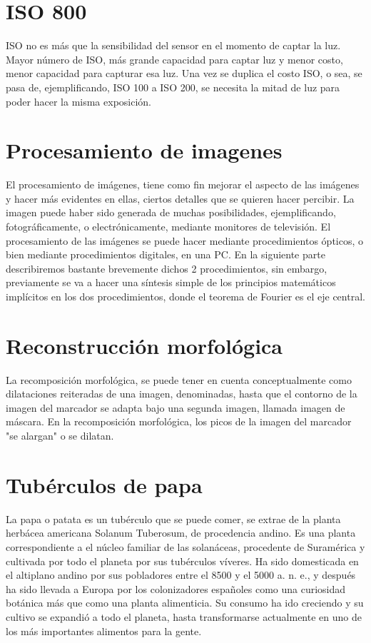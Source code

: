 \section{ISO 800} ISO no es más que la sensibilidad del sensor en el momento de captar la luz. Mayor número de ISO, más grande capacidad para captar luz y menor costo, menor capacidad para capturar esa luz. Una vez se duplica el costo ISO, o sea, se pasa de, ejemplificando, ISO 100 a ISO 200, se necesita la mitad de luz para poder hacer la misma exposición.
\\ 

\section{Procesamiento de imagenes} El procesamiento de imágenes, tiene como fin mejorar el aspecto de las imágenes y hacer más evidentes en ellas, ciertos detalles que se quieren hacer percibir. La imagen puede haber sido generada de muchas posibilidades, ejemplificando, fotográficamente, o electrónicamente, mediante monitores de televisión. El procesamiento de las imágenes se puede hacer mediante procedimientos ópticos, o bien mediante procedimientos digitales, en una PC. En la siguiente parte describiremos bastante brevemente dichos 2 procedimientos, sin embargo, previamente se va a hacer una síntesis simple de los principios matemáticos implícitos en los dos procedimientos, donde el teorema de Fourier es el eje central.
\\ 

\section{Reconstrucción morfológica} La recomposición morfológica, se puede tener en cuenta conceptualmente como dilataciones reiteradas de una imagen, denominadas, hasta que el contorno de la imagen del marcador se adapta bajo una segunda imagen, llamada imagen de máscara. En la recomposición morfológica, los picos de la imagen del marcador "se alargan"  o se dilatan.
\\ 

\section{Tubérculos de papa} La papa o patata es un tubérculo que se puede comer, se extrae de la planta herbácea americana Solanum Tuberosum, de procedencia andino. Es una planta correspondiente a el núcleo familiar de las solanáceas, procedente de Suramérica y cultivada por todo el planeta por sus tubérculos víveres. Ha sido domesticada en el altiplano andino por sus pobladores entre el 8500 y el 5000 a. n. e., y después ha sido llevada a Europa por los colonizadores españoles como una curiosidad botánica más que como una planta alimenticia. Su consumo ha ido creciendo y su cultivo se expandió a todo el planeta, hasta transformarse actualmente en uno de los más importantes alimentos para la gente.
\\ 

